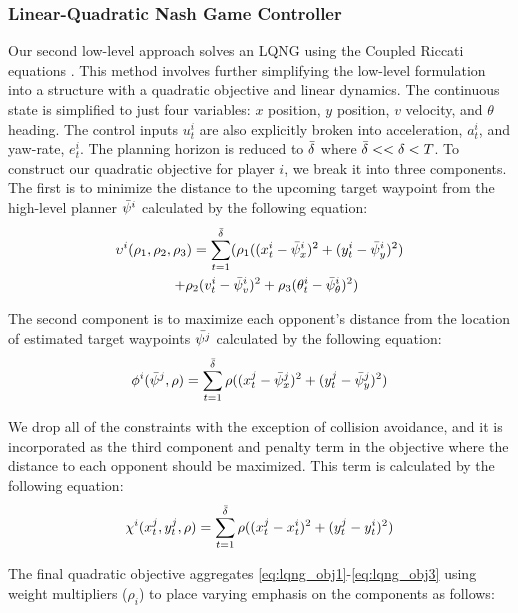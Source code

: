 \subsubsection{Linear-Quadratic Nash Game Controller}
Our second low-level approach solves an LQNG using the Coupled Riccati equations \cite{basar}. This method involves further simplifying the low-level formulation into a structure with a quadratic objective and linear dynamics. The continuous state is simplified to just four variables: $x$ position, $y$ position, $v$ velocity, and $\theta$ heading. The control inputs $u^i_t$ are also explicitly broken into acceleration, $a^i_t$, and yaw-rate, $e^i_t$. The planning horizon is reduced to $\Bar{\delta}$ where $\Bar{\delta} << \delta < T$. To construct our quadratic objective for player $i$, we break it into three components. The first is to minimize the distance to the upcoming target waypoint from the high-level planner $\Bar{\psi}^i$ calculated by the following equation:
\begin{multline} \label{eq:lqng_obj1}
\upsilon^i(\rho_1, \rho_2,\rho_3) =  \sum_{t = 1}^{\Bar{\delta}} (\rho_1((x^i_{t} - \Bar{\psi}^i_x)^2 + (y^i_{t} - \Bar{\psi}^i_y)^2) \\   \quad + \rho_2 (v^i_{t} - \Bar{\psi}^i_v)^2 
 + \rho_3 (\theta^i_{t} - \Bar{\psi}^i_\theta)^2)
\end{multline}

The second component is to maximize each opponent's distance from the location of estimated target waypoints $\Bar{\psi^j}$ calculated by the following equation:
\begin{equation} \label{eq:lqng_obj2}
    \phi^i(\Bar{\psi}^j, \rho) = \sum_{t = 1}^{\Bar{\delta}} \rho((x^j_{t} - \Bar{\psi}^j_x)^2 + (y^j_{t} - \Bar{\psi}^j_y)^2)
\end{equation}

We drop all of the constraints with the exception of collision avoidance, and it is incorporated as the third component and penalty term in the objective where the distance to each opponent should be maximized. This term is calculated by the following equation:
\begin{equation} \label{eq:lqng_obj3}
    \chi^i(x^j_t, y^j_t, \rho) = \sum_{t = 1}^{\Bar{\delta}} \rho((x^j_{t} - x^i_{t})^2 + (y^j_{t} - y^i_{t})^2)
\end{equation}

The final quadratic objective aggregates \eqref{eq:lqng_obj1}-\eqref{eq:lqng_obj3} using weight multipliers ($\rho_i$) to place varying emphasis on the components as follows:

